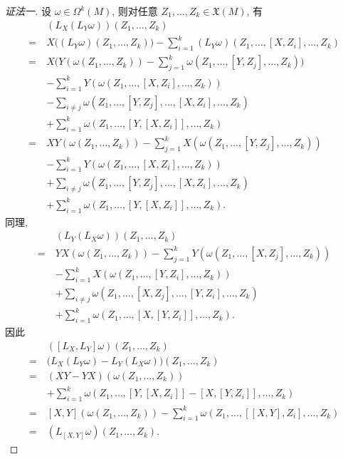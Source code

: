     \begin{proof}[证法一]
        设 $\omega\in\Omega^k(M)$, 则对任意 $Z_1,\dots,Z_k\in\mathfrak{X}(M)$, 有
        \begin{align*}
            &(L_X(L_Y\omega))(Z_1,\dots,Z_k) \\
            =& X\big((L_Y\omega)(Z_1,\dots,Z_k)\big) 
            - \sum_{i=1}^{k}(L_Y\omega)(Z_1,\dots,[X,Z_i],\dots,Z_k) \\
            =& X\Big(Y(\omega(Z_1,\dots,Z_k)) - \sum_{j=1}^{k}\omega(Z_1,\dots,[Y,Z_j],\dots,Z_k)\Big) \\
            \quad& - \sum_{i=1}^{k}Y(\omega(Z_1,\dots,[X,Z_i],\dots,Z_k)) \\
            \quad& - \sum_{i\neq j}\omega(Z_1,\dots,[Y,Z_j],\dots,[X,Z_i],\dots,Z_k) \\
            \quad& + \sum_{i=1}^{k}\omega(Z_1,\dots,[Y,[X,Z_i]],\dots,Z_k) \\
            =& XY(\omega(Z_1,\dots,Z_k)) - \sum_{j=1}^{k}X(\omega(Z_1,\dots,[Y,Z_j],\dots,Z_k)) \\
            \quad& - \sum_{i=1}^{k}Y(\omega(Z_1,\dots,[X,Z_i],\dots,Z_k)) \\
            \quad& + \sum_{i\neq j}\omega(Z_1,\dots,[Y,Z_j],\dots,[X,Z_i],\dots,Z_k) \\
            \quad& + \sum_{i=1}^{k}\omega(Z_1,\dots,[Y,[X,Z_i]],\dots,Z_k).
        \end{align*}
        同理,
        \begin{align*}
            &(L_Y(L_X\omega))(Z_1,\dots,Z_k) \\
            =& YX(\omega(Z_1,\dots,Z_k)) - \sum_{j=1}^{k}Y(\omega(Z_1,\dots,[X,Z_j],\dots,Z_k)) \\
            \quad& - \sum_{i=1}^{k}X(\omega(Z_1,\dots,[Y,Z_i],\dots,Z_k)) \\
            \quad& + \sum_{i\neq j}\omega(Z_1,\dots,[X,Z_j],\dots,[Y,Z_i],\dots,Z_k) \\
            \quad& + \sum_{i=1}^{k}\omega(Z_1,\dots,[X,[Y,Z_i]],\dots,Z_k).
        \end{align*}
        因此
        \begin{align*}
            &([L_X,L_Y]\omega)(Z_1,\dots,Z_k) \\ 
            =& \Big(L_X(L_Y\omega)-L_Y(L_X\omega)\Big)(Z_1,\dots,Z_k) \\
            =& (XY - YX)(\omega(Z_1,\dots,Z_k)) \\
            \quad& + \sum_{i=1}^{k}\omega(Z_1,\dots,[Y,[X,Z_i]]-[X,[Y,Z_i]],\dots,Z_k) \\
            =& [X,Y](\omega(Z_1,\dots,Z_k)) - \sum_{i=1}^{k}\omega(Z_1,\dots,[[X,Y],Z_i],\dots,Z_k) \\
            =& (L_{[X,Y]}\omega)(Z_1,\dots,Z_k).
        \end{align*}
    \end{proof}

